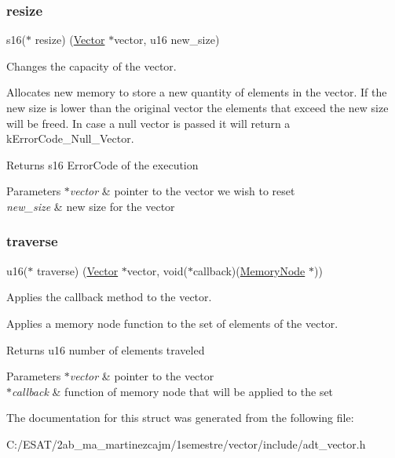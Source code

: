 \subsubsection{\texorpdfstring{resize}{resize}}
{\footnotesize\ttfamily s16($\ast$ resize) (\hyperlink{structadt__vector__s}{Vector} $\ast$vector, u16 new\+\_\+size)}



Changes the capacity of the vector. 

Allocates new memory to store a new quantity of elements in the vector. If the new size is lower than the original vector the elements that exceed the new size will be freed. In case a null vector is passed it will return a k\+Error\+Code\+\_\+\+Null\+\_\+\+Vector.

\begin{DoxyReturn}{Returns}
s16 Error\+Code of the execution 
\end{DoxyReturn}

\begin{DoxyParams}{Parameters}
{\em $\ast$vector} & pointer to the vector we wish to reset \\
\hline
{\em new\+\_\+size} & new size for the vector \\
\hline
\end{DoxyParams}
\mbox{\label{structadt__vector__ops__s_adbe456b86e4731faacaf91a43cb51e11}} 
\subsubsection{\texorpdfstring{traverse}{traverse}}
{\footnotesize\ttfamily u16($\ast$ traverse) (\hyperlink{structadt__vector__s}{Vector} $\ast$vector, void($\ast$callback)(\hyperlink{structmemory__node__s}{Memory\+Node} $\ast$))}



Applies the callback method to the vector. 

Applies a memory node function to the set of elements of the vector.

\begin{DoxyReturn}{Returns}
u16 number of elements traveled 
\end{DoxyReturn}

\begin{DoxyParams}{Parameters}
{\em $\ast$vector} & pointer to the vector \\
\hline
{\em $\ast$callback} & function of memory node that will be applied to the set \\
\hline
\end{DoxyParams}


The documentation for this struct was generated from the following file\+:\begin{DoxyCompactItemize}
\item 
C\+:/\+E\+S\+A\+T/2ab\+\_\+ma\+\_\+martinezcajm/1semestre/vector/include/adt\+\_\+vector.\+h\end{DoxyCompactItemize}
